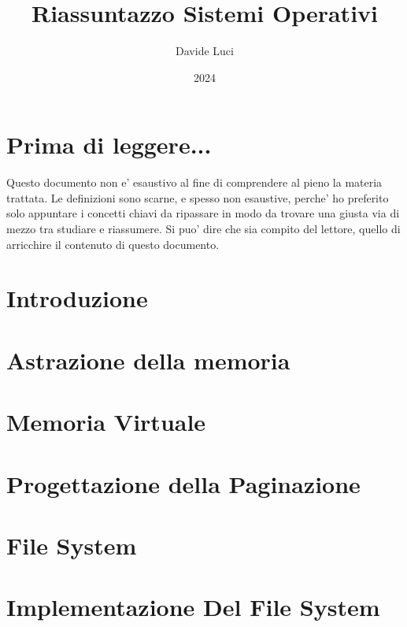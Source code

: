 \documentclass{article}
\title{Riassuntazzo Sistemi Operativi}
\author{Davide Luci}
\date{2024}
\begin{document}
    \maketitle
    \tableofcontents
    \newpage


    \setlength{\parindent}{0pt}
    \section{ Prima di leggere...}
    Questo documento non e' esaustivo al fine di comprendere al pieno la materia trattata.
    Le definizioni sono scarne, e spesso non esaustive, perche' ho preferito solo appuntare i concetti chiavi
    da ripassare in modo da trovare una giusta via di mezzo tra studiare e riassumere. Si puo' dire che sia compito del 
    lettore, quello di arricchire il contenuto di questo documento.

    \section {Introduzione}
        

    \section {Astrazione della memoria}
        
    \section {Memoria Virtuale}
        
    \section {Progettazione della Paginazione}
        

    \newpage
    \section {File System}
        
        
    \newpage
    \section {Implementazione Del File System}
        
\end{document}

